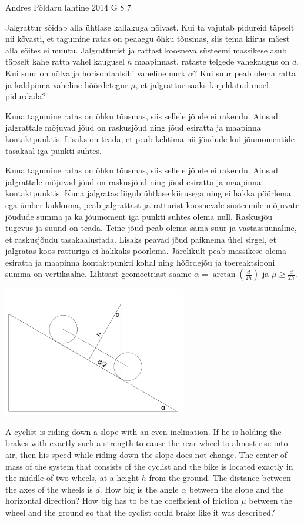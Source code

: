 {Andres Põldaru} %
{lahtine} %
{2014} %
{G 8} %
{7} %
{
\ifStatement
Jalgrattur sõidab alla ühtlase kallakuga nõlvast. Kui ta vajutab pidureid täpselt nii kõvasti, et tagumine ratas on peaaegu õhku tõusmas, siis tema kiirus mäest alla sõites ei muutu.  Jalgratturist ja rattast koosneva süsteemi massikese asub täpselt kahe ratta vahel kaugusel $h$ maapinnast, rataste telgede vahekaugus on $d$. Kui suur on nõlva ja horisontaalsihi vaheline nurk $\alpha$? Kui suur peab olema ratta ja kaldpinna vaheline hõõrdetegur $\mu$, et jalgrattur saaks kirjeldatud moel pidurdada?
\fi


\ifHint
Kuna tagumine ratas on õhku tõusmas, siis sellele jõude ei rakendu. Ainsad jalgrattale mõjuvad jõud on raskusjõud ning jõud esiratta ja maapinna kontaktpunktis. Lisaks on teada, et peab kehtima nii jõudude kui jõumomentide tasakaal iga punkti suhtes.
\fi


\ifSolution
Kuna tagumine ratas on õhku tõusmas, siis sellele jõude ei rakendu. Ainsad jalgrattale mõjuvad jõud on raskusjõud ning jõud esiratta ja maapinna kontaktpunktis. Kuna jalgratas liigub ühtlase kiirusega ning ei hakka pöörlema ega ümber kukkuma, peab jalgrattast ja ratturist koosnevale süsteemile mõjuvate jõudude summa ja ka jõumoment iga punkti suhtes olema null. Raskusjõu tugevus ja suund on teada. Teine jõud peab olema sama suur ja vastassuunaline, et raskusjõudu tasakaalustada. Lisaks peavad jõud paiknema ühel sirgel, et jalgratas koos ratturiga ei hakkaks pöörlema. Järelikult peab massikese olema esiratta ja maapinna kontaktpunkti kohal ning hõõrdejõu ja toereaktsiooni summa on vertikaalne. Lihtsast geomeetriast saame $\alpha=\arctan(\frac{d}{2h})$ ja $\mu\ge\frac{d}{2h}$.
\begin{center}
\includegraphics[width=0.6\textwidth]{2014-lahg-08-ratas}
\end{center}
\fi


\ifEngStatement
A cyclist is riding down a slope with an even inclination. If he is holding the brakes with exactly such a strength to cause the rear wheel to almost rise into air, then his speed while riding down the slope does not change. The center of mass of the system that consists of the cyclist and the bike is located exactly in the middle of two wheels, at a height $h$ from the ground. The distance between the axes of the wheels is $d$. How big is the angle $\alpha$ between the slope and the horizontal direction? How big has to be the coefficient of friction $\mu$ between the wheel and the ground so that the cyclist could brake like it was described?
\fi


}
